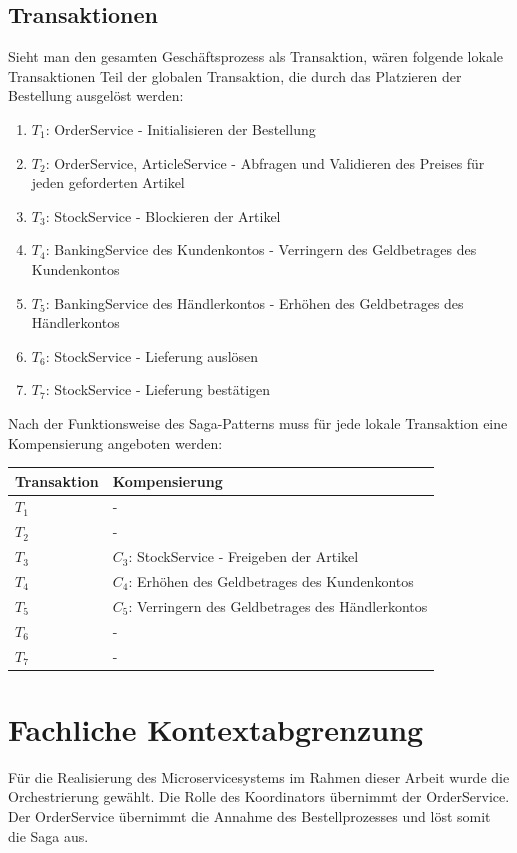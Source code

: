 \subsection{Transaktionen}
Sieht man den gesamten Geschäftsprozess als Transaktion, wären folgende lokale Transaktionen Teil der globalen Transaktion, die durch das Platzieren der Bestellung ausgelöst werden:
\begin{enumerate}
	\item $T_1$: OrderService - Initialisieren der Bestellung
	\item $T_2$: OrderService, ArticleService - Abfragen und Validieren des Preises für jeden geforderten Artikel 
	\item $T_3$: StockService - Blockieren der Artikel
	\item $T_4$: BankingService des Kundenkontos - Verringern des Geldbetrages des Kundenkontos
	\item $T_5$: BankingService des Händlerkontos - Erhöhen des Geldbetrages des Händlerkontos
	\item $T_6$: StockService - Lieferung auslösen
	\item $T_7$: StockService - Lieferung bestätigen
\end{enumerate}

Nach der Funktionsweise des Saga-Patterns muss für jede lokale Transaktion eine Kompensierung angeboten werden:

\begin{tabular}[h]{|l|l|}
	\hline
	Transaktion & Kompensierung \\ \hline
	$T_1$ & - \\ \hline
	$T_2$ & - \\ \hline
	$T_3$ & $C_3$: StockService - Freigeben der Artikel \\ \hline
	$T_4$ & $C_4$: Erhöhen des Geldbetrages des Kundenkontos \\ \hline
	$T_5$ & $C_5$: Verringern des Geldbetrages des Händlerkontos \\ \hline
	$T_6$ &  - \\ \hline
	$T_7$ &  - \\ \hline
\end{tabular}


\section{Fachliche Kontextabgrenzung}

Für die Realisierung des Microservicesystems im Rahmen dieser Arbeit wurde die Orchestrierung gewählt. %
Die Rolle des Koordinators übernimmt der OrderService. Der OrderService übernimmt die Annahme des Bestellprozesses und löst somit die Saga aus. 

